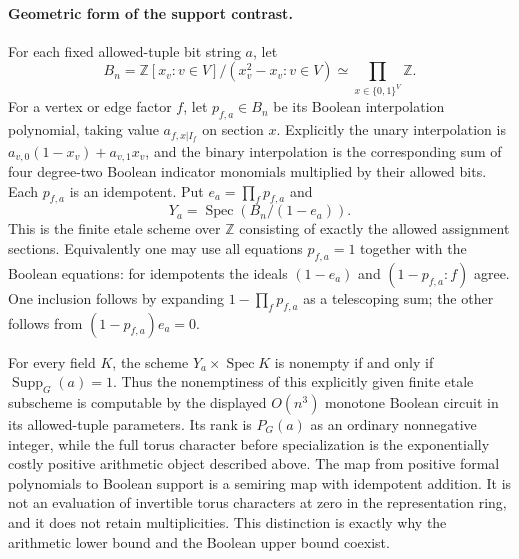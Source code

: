 \paragraph{Geometric form of the support contrast.}
For each fixed allowed-tuple bit string $a$, let
\[
 B_n=\mathbb Z[x_v:v\in V]/(x_v^2-x_v:v\in V)
                   \simeq\prod_{x\in\{0,1\}^V}\mathbb Z.
\]
For a vertex or edge factor $f$, let $p_{f,a}\in B_n$ be its
Boolean interpolation polynomial, taking value $a_{f,x|I_f}$
on section $x$.  Explicitly the unary interpolation is
$a_{v,0}(1-x_v)+a_{v,1}x_v$, and the binary interpolation is
the corresponding sum of four degree-two Boolean indicator
monomials multiplied by their allowed bits.  Each $p_{f,a}$
is an idempotent.  Put $e_a=\prod_f p_{f,a}$ and
\[
                 Y_a=\operatorname{Spec}(B_n/(1-e_a)).
\]
This is the finite etale scheme over $\mathbb Z$ consisting of
exactly the allowed assignment sections.  Equivalently one may
use all equations $p_{f,a}=1$ together with the Boolean equations:
for idempotents the ideals $(1-e_a)$ and $(1-p_{f,a}:f)$ agree.
One inclusion follows by expanding $1-\prod_f p_{f,a}$ as a
telescoping sum; the other follows from
$(1-p_{f,a})e_a=0$.

For every field $K$, the scheme $Y_a\times\operatorname{Spec}K$
is nonempty if and only if $\operatorname{Supp}_G(a)=1$.
Thus the nonemptiness of this explicitly given finite etale
subscheme is computable by the displayed $O(n^3)$ monotone
Boolean circuit in its allowed-tuple parameters.  Its rank is
$P_G(a)$ as an ordinary nonnegative integer, while the full
torus character before specialization is the exponentially
costly positive arithmetic object described above.  The map
from positive formal polynomials to Boolean support is a
semiring map with idempotent addition.  It is not an evaluation
of invertible torus characters at zero in the representation
ring, and it does not retain multiplicities.  This distinction
is exactly why the arithmetic lower bound and the Boolean
upper bound coexist.
